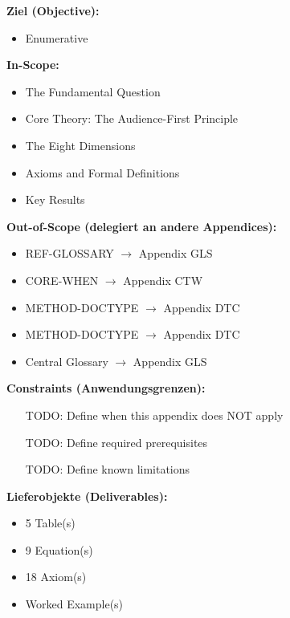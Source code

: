 \begin{tcolorbox}[
    colback=orange!5!white,
    colframe=orange!75!black,
    title={\textbf{Appendix Scope: Ziel / In-Scope / Out-of-Scope / Constraints}},
    fonttitle=\bfseries
]

\textbf{Ziel (Objective):}
\begin{itemize}[nosep]
    \item Enumerative
\end{itemize}

\textbf{In-Scope:}
\begin{itemize}[nosep]
    \item The Fundamental Question
    \item Core Theory: The Audience-First Principle
    \item The Eight Dimensions
    \item Axioms and Formal Definitions
    \item Key Results
\end{itemize}

\textbf{Out-of-Scope (delegiert an andere Appendices):}
\begin{itemize}[nosep]
    \item REF-GLOSSARY $\rightarrow$ Appendix GLS
    \item CORE-WHEN $\rightarrow$ Appendix CTW
    \item METHOD-DOCTYPE $\rightarrow$ Appendix DTC
    \item METHOD-DOCTYPE $\rightarrow$ Appendix DTC
    \item Central Glossary $\rightarrow$ Appendix GLS
\end{itemize}

\textbf{Constraints (Anwendungsgrenzen):}
\begin{itemize}[nosep]
    \item [TODO: Define when this appendix does NOT apply]
    \item [TODO: Define required prerequisites]
    \item [TODO: Define known limitations]
\end{itemize}

\textbf{Lieferobjekte (Deliverables):}
\begin{itemize}[nosep]
    \item 5 Table(s)
    \item 9 Equation(s)
    \item 18 Axiom(s)
    \item Worked Example(s)
\end{itemize}

\end{tcolorbox}





